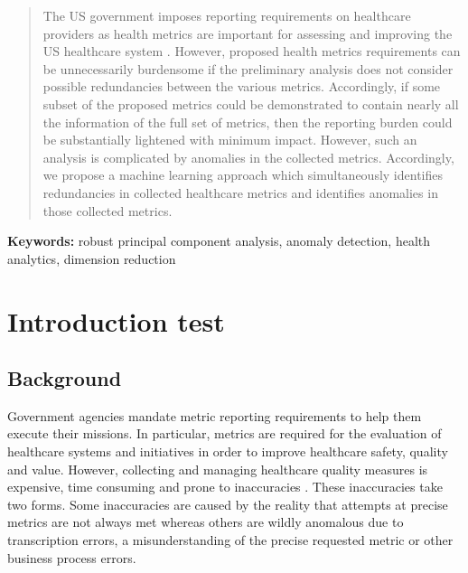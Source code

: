 \documentclass[conference]{IEEEtran}
\begin{document}
\begin{abstract}


The US government imposes reporting requirements on healthcare providers as health metrics are important for assessing and improving the US healthcare system .  However, proposed health metrics requirements can be unnecessarily burdensome if the preliminary analysis does not consider possible redundancies between the various metrics.  Accordingly, if some subset of the proposed metrics could be demonstrated to contain nearly all the information of  the full set of metrics,
then the reporting burden could be substantially  lightened with minimum impact.  However, such an analysis is complicated by anomalies in the collected metrics.  Accordingly, we propose a machine learning approach which simultaneously identifies redundancies in collected healthcare metrics and identifies anomalies in those collected metrics.
\end{abstract}

{\bf Keywords:} robust principal component analysis, anomaly
detection, health analytics, dimension reduction

\section{Introduction test}

\subsection{Background}
Government agencies  mandate  metric reporting requirements to help them execute their missions.  In particular,  metrics are required for the evaluation of healthcare systems and initiatives in order to improve healthcare safety, quality and value. However, collecting and managing healthcare quality measures is expensive,  time consuming and prone to inaccuracies \cite{rao2017impact, cutler2012reducing}.  These inaccuracies take two forms.  Some inaccuracies are caused by the reality that attempts at precise metrics are not always met whereas others are wildly anomalous due to transcription errors, a misunderstanding of the precise requested metric or other business process errors.
\end{document}
